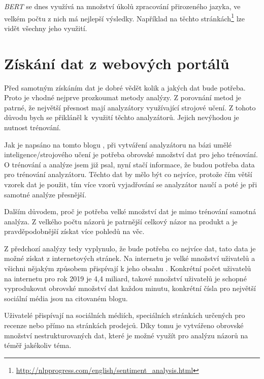 \emph{BERT} se dnes využívá na množství úkolů zpracování přirozeného jazyka, ve velkém počtu z nich má nejlepší výsledky. Například na těchto stránkách\footnote{\url{http://nlpprogress.com/english/sentiment_analysis.html}} lze vidět všechny jeho využití.


\section{Získání dat z webových portálů}
\label{stahovani}
Před samotným získáním dat je dobré vědět kolik a jakých dat bude potřeba. Proto je vhodné nejprve prozkoumat metody analýzy. Z porovnání metod \cite{approaches} je patrné, že největší přesnost mají analyzátory využívající strojové učení. Z tohoto důvodu bych se přikláněl k~využití těchto analyzátorů. Jejich nevýhodou je nutnost trénování.

Jak je napsáno na tomto blogu \cite{dataamount}, při vytváření analyzátoru na bázi umělé inteligence/strojového učení je potřeba obrovské množství dat pro jeho trénování. O trénování a analýze jsem již psal, nyní stačí informace, že budou potřeba data pro trénování analyzátoru. Těchto dat by mělo být co nejvíce, protože čím větší vzorek dat je použit, tím více vzorů vyjadřování se analyzátor naučí a poté je při samotné analýze přesnější.

Dalším důvodem, proč je potřeba velké množství dat je mimo trénování samotná analýza. Z velkého počtu názorů je patrnější celkový názor na produkt a je pravděpodobnější získat více pohledů na věc.

Z předchozí analýzy tedy vyplynulo, že bude potřeba co nejvíce dat, tato data je možné získat z internetových stránek. Na internetu je velké množství uživatelů a všichni nějakým způsobem přispívají k jeho obsahu \cite{useramount}. Konkrétní počet uživatelů na internetu pro rok 2019 je 4,4 miliard, takové množství uživatelů je schopné vyprodukovat obrovské množství dat každou minutu, konkrétní čísla pro největší sociální média jsou na citovaném blogu.

Uživatelé přispívají na sociálních médiích, speciálních stránkách určených pro recenze nebo přímo na stránkách prodejců. Díky tomu je vytvářeno obrovské množství nestrukturovaných dat, které je možné využít pro analýzu názorů na téměř jakékoliv téma.

